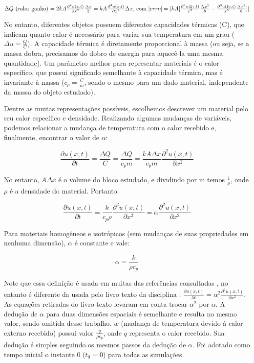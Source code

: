 \documentclass[12pt,fleqn]{article}
\begin{document}
\[\Delta Q $ (calor ganho) $ = 2 k A \frac{\partial^2 u(x, t)}{\partial x^2} \frac{\Delta x}{2} = k A \frac{\partial^2 u(x, t)}{\partial x^2} \Delta x $, com $|erro| = |k A [ \frac{\partial^3 u(\xi_1, t)}{x^3} \frac{\Delta x^2}{8} - \frac{\partial^3 u(\xi_2, t)}{x^3} \frac{\Delta x^2}{8}]|\]

No entanto, diferentes objetos possuem diferentes capacidades térmicas (C), que indicam quanto calor é necessário para variar sua temperatura em um grau ($\Delta u = \frac{Q}{C}$). A capacidade térmica é diretamente proporcional à massa (ou seja, se a massa dobra, precisamos do dobro de energia para aquecê-la uma mesma quantidade). Um parâmetro melhor para representar materiais é o calor específico, que possui significado semelhante à capacidade térmica, mas é invariante à massa ($c_p = \frac{C}{m}$, sendo o mesmo para um dado material, independente da massa do objeto estudado).

Dentre as muitas representações possíveis, escolhemos descrever um material pelo seu calor específico e densidade. Realizando algumas mudanças de variáveis, podemos relacionar a mudança de temperatura com o calor recebido e, finalmente, encontrar o valor de $\alpha$:

\[
\frac{\partial u(x, t)}{\partial t} = \frac{\Delta Q}{C} = \frac{\Delta Q}{c_p m} = \frac{k A \Delta x}{c_p m} \frac{\partial^2 u(x, t)}{\partial x^2}
\]

No entanto, $A \Delta x$ é o volume do bloco estudado, e dividindo por m temos $\frac{1}{\rho}$, onde $\rho$ é a densidade do material. Portanto:

\[
\frac{\partial u(x, t)}{\partial t} = \frac{k}{c_p \rho} \frac{\partial^2 u(x, t)}{\partial x^2} = \alpha \frac{\partial^2 u(x, t)}{\partial x^2}
\]

Para materiais homogêneos e isotrópicos (sem mudanças de suas propriedades em nenhuma dimensão), $\alpha$ é constante e vale:

\[\alpha = \frac{k}{\rho c_p}\]

Note que essa definição é usada em muitas das referências consultadas \cite{ufsc_geracao_de_calor} \cite{MIT}, no entanto é diferente da usada pelo livro texto da disciplina \cite{livro}: $\frac{\partial u(x, t)}{\partial t} = \alpha^2 \frac{\partial^2 u(x, t)}{\partial x^2}$. As equações retiradas do livro texto levaram em conta trocar $\alpha^2$ por $\alpha$. A dedução de $\alpha$ para duas dimensões espaciais é semelhante e resulta no mesmo valor, sendo omitida desse trabalho. $w$ (mudança de temperatura devido à calor externo recebido) possui valor $\frac{\dot q}{\rho c_p}$, onde $\dot q$ representa o calor recebido. Sua dedução é simples seguindo os mesmos passos da dedução de $\alpha$. Foi adotado como tempo inicial o instante 0 ($t_0 = 0$) para todas as simulações.
\end{document}
